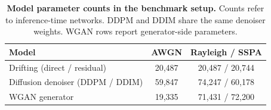 \begin{table}[t]
\centering
\caption{\textbf{Model parameter counts in the benchmark setup.} Counts refer to inference-time networks. DDPM and DDIM share the same denoiser weights. WGAN rows report generator-side parameters.}
\label{tab:model-size}
\tablefontsize
\begin{tabular}{@{}lcc@{}}
\toprule
Model & AWGN & Rayleigh / SSPA \\
\midrule
Drifting (direct / residual) & 20{,}487 & 20{,}487 / 20{,}744 \\
Diffusion denoiser (DDPM / DDIM) & 59{,}847 & 74{,}247 / 60{,}178 \\
WGAN generator & 19{,}335 & 71{,}431 / 72{,}200 \\
\bottomrule
\end{tabular}
\end{table}
